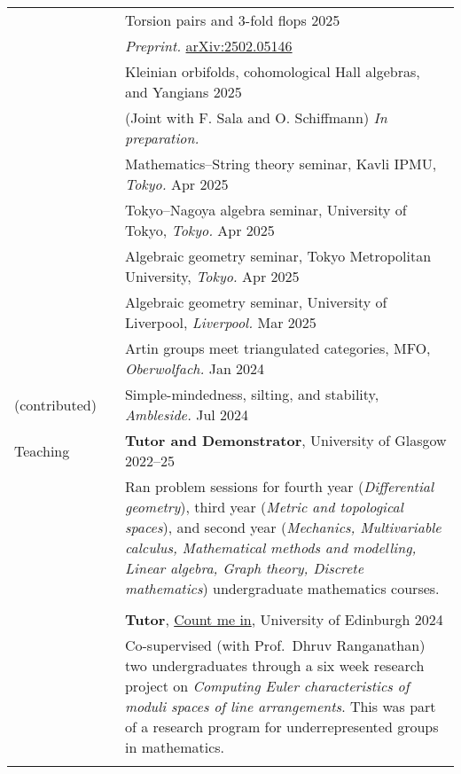 \documentclass[10pt]{article}
\newcommand{\nextItem}{\\[0.25em]}
\newcommand{\nextSection}{\\[0.5em]}
\begin{document}
\begin{longtable}{>{\raggedleft\arraybackslash}p{0.8in}>{}p{0.05in}>{}p{5.7in}}
        \nextItem
        && Torsion pairs and 3-fold flops \hfill 2025\\
        && \emph{Preprint.}
        \href{https://arxiv.org/abs/2502.05146}{arXiv:2502.05146}
        \nextItem
        && Kleinian orbifolds, cohomological Hall algebras, and Yangians
           \hfill 2025\\
        && (Joint with F. Sala and O. Schiffmann) \emph{In preparation.}
        \nextSection
    \multirow{2}{0.8in}{\raggedleft\arraybackslash Selected talks (invited)}%
        && Mathematics--String theory seminar, Kavli IPMU, \emph{Tokyo.}
        \hfill Apr 2025\nextItem
        && Tokyo--Nagoya algebra seminar, University of Tokyo, \emph{Tokyo.}
        \hfill Apr 2025\nextItem
        && Algebraic geometry seminar, Tokyo Metropolitan University, \emph{Tokyo.}
        \hfill Apr 2025\nextItem
        && Algebraic geometry seminar, University of Liverpool, \emph{Liverpool.}
        \hfill Mar 2025\nextItem
        && Artin groups meet triangulated categories, MFO, \emph{Oberwolfach.}
        \hfill Jan 2024\nextItem
    (contributed)%
        && Simple-mindedness, silting, and stability, \emph{Ambleside.}
        \hfill Jul 2024\nextSection
    Teaching%
        && \textbf{Tutor and Demonstrator}, University of Glasgow \hfill
        2022--25\\[0.25em]
        && \begin{minipage}[c]{4.3in}
        Ran problem sessions for fourth year (\emph{Differential geometry}),
        third year (\emph{Metric and topological spaces}), and second year
        (\emph{Mechanics, Multivariable calculus, Mathematical methods and
        modelling, Linear algebra, Graph theory, Discrete mathematics})
        undergraduate mathematics courses.
        \end{minipage}\\\\[-0.6em]
        && \textbf{Tutor}, \href{https://www.agq-cdt.org/count-me-in/}{Count me
        in}, University of Edinburgh \hfill 2024\\[0.25em]
        && \begin{minipage}[c]{4.3in}
        Co-supervised (with Prof.\ Dhruv Ranganathan) two undergraduates
        through a six week research project on \emph{Computing Euler
        characteristics of moduli spaces of line arrangements}. This was part of
        a research program for underrepresented groups in mathematics.
        \end{minipage}\\\\[-0.6em]

\end{longtable}
\end{document}
